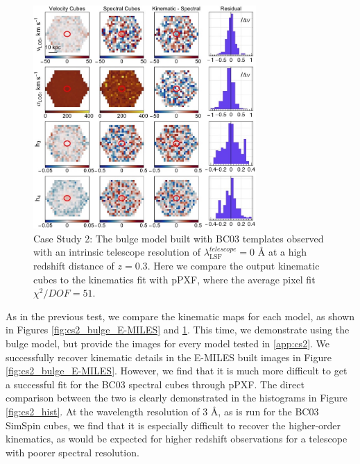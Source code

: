 \documentclass[
  journal=pasa,
  manuscript=research-paper, %
  year=2020,
  volume=37,
]{cup-journal}
\begin{document}
\begin{figure}
    \centering
    \includegraphics[keepaspectratio, width=8.5cm]{cs2_bulge_velocities_highz_BC03hr.jpeg}
    \caption{Case Study 2: The bulge model built with BC03 templates observed with an intrinsic telescope resolution of  $\lambda_{\text{LSF}}^{telescope} = 0$ \AA{} at a high redshift distance of $z = 0.3$. Here we compare the output kinematic cubes to the kinematics fit with pPXF, where the average pixel fit $\chi^2/DOF = 51$.}
    \label{fig:cs2_bulge_BC03}
\end{figure}

As in the previous test, we compare the kinematic maps for each model, as shown in Figures \ref{fig:cs2_bulge_E-MILES} and \ref{fig:cs2_bulge_BC03}.
This time, we demonstrate using the bulge model, but provide the images for every model tested in \ref{app:cs2}.
We successfully recover kinematic details in the E-MILES built images in Figure \ref{fig:cs2_bulge_E-MILES}.  
However, we find that it is much more difficult to get a successful fit for the BC03 spectral cubes through pPXF. 
The direct comparison between the two is clearly demonstrated in the histograms in Figure \ref{fig:cs2_hist}.
At the wavelength resolution of 3 \AA, as is run for the \textsc{BC03} SimSpin cubes, we find that it is especially difficult to recover the higher-order kinematics, as would be expected for higher redshift observations for a telescope with poorer spectral resolution. 
\end{document}
